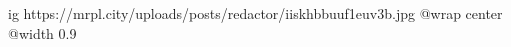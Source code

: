  
 
 
 
 

\ifcmt
  ig https://mrpl.city/uploads/posts/redactor/iiskhbbuuf1euv3b.jpg
  @wrap center
  @width 0.9
\fi
